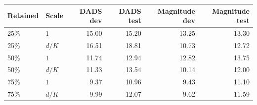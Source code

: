 \begin{tabular}{@{}llrrrr@{}}
\toprule
Retained & Scale & DADS dev & DADS test & Magnitude dev & Magnitude test\\
\midrule
25\% & $1$ & 15.00 & 15.20 & 13.25 & 13.30\\
25\% & $d/K$ & 16.51 & 18.81 & 10.73 & 12.72\\
50\% & $1$ & 11.74 & 12.94 & 12.82 & 13.75\\
50\% & $d/K$ & 11.33 & 13.54 & 10.14 & 12.00\\
75\% & $1$ & 9.37 & 10.96 & 9.43 & 11.10\\
75\% & $d/K$ & 9.99 & 12.07 & 9.62 & 11.59\\
\bottomrule
\end{tabular}
